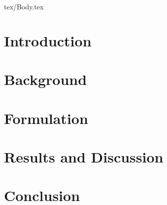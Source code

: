\documentclass[11pt, twoside, draft]{article}
\begin{document}
\clearpage


\setcounter{tocdepth}{3}

\tableofcontents

\clearpage


%
\printnoidxglossaries

\clearpage

\listoftodos


\cleardoublepage




\ifdraft{

}
{
\begin{multicols}{2}

\end{multicols}
}
\begin{filecontents}{tex/Body.tex}

\section{Introduction}
\label{sec:introduction}


%

\section{Background}
\label{sec:background}


%

\section{Formulation}
\label{sec:formulation}


% 

\clearpage

\section{Results and Discussion}
\label{sec:results}


%

\section{Conclusion}
\label{sec:conclusion}




\end{filecontents}
\end{document}
